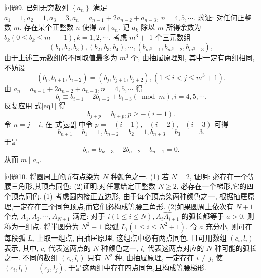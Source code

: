 问题9. 已知无穷数列 $\left\{a_n\right\}$ 满足 $a_1=1, a_2=1, a_3=3, a_n=a_{n-1}+2 a_{n-2}+a_{n-3}$, $n=4,5, \cdots$. 求证: 对任何正整数 $m$, 存在某个正整数 $n$ 使得 $m \mid a_n$.
记 $a_k$ 除以 $m$ 所得余数为 $b_k\left(0 \leqslant b_k \leqslant m^{-}-1\right), k=1,2, \cdots$. 考虑 $m^3+$ 1 个三元数组
$$
\left(b_1, b_2, b_3\right),\left(b_2, b_3, b_4\right), \cdots,\left(b_{m^3+1}, b_{m^3+2}, b_{m^3+3}\right),
$$
由于上述三元数组的不同取值最多为 $m^3$ 个, 由抽屉原理知, 其中一定有两组相同, 不妨设
$$
\left(b_i, b_{i+1}, b_{i+2}\right)=\left(b_j, b_{j+1}, b_{j+2}\right),\left(1 \leqslant i<j \leqslant m^3+1\right) .
$$
由 $a_n=a_{n-1}+2 a_{n-2}+a_{n-3}, n=4,5, \cdots$ 得
$$
b_i \equiv b_{i-1}+2 b_{i-2}+b_{i-3}(\bmod m), i=4,5, \cdots . \label{eq1}
$$
反复应用 式\ref{eq1} 得
$$
b_{j+p}=b_{i+p}, p \geqslant-(i-1) . \label{eq2}
$$
令 $n=j-i$, 在 式\ref{eq2} 中令 $p=-(i-1),-(i-2),-(i-3)$ 可得
$$
b_{n+1}=b_1=1, b_{n+2}=b_2=1, b_{n+3}=b_3==3 .
$$
于是
$$
b_n=b_{n+3}-2 b_{n+2}-b_{n+1}=0 .
$$
从而 $m \mid a_n$.



问题10. 将圆周上的所有点染为 $N$ 种颜色之一.
(1) 若 $N=2$, 证明: 必存在一个等腰三角形,其顶点同色;
(2)证明:对任意给定正整数 $N \geqslant 2$, 必存在一个梯形,它的四个顶点同色.
(1) 考虑圆内接正五边形, 由于每个顶点染两种颜色之一, 根据抽屉原理,一定存在三个同色顶点,而它们必构成等腰三角形.
(2)如果圆周上依次有 $N+1$ 个点 $A_1, A_2, \cdots, A_{N+1}$ 满足: 对于 $i(1 \leqslant i \leqslant N), \widehat{A_i A_{i+1}}$ 的弧长都等于 $a>0$, 则称为一组点.
将半圆分为 $N^2+1$ 段弧 $L_i\left(1 \leqslant i \leqslant N^2+1\right)$. 令 $a$ 充分小, 则可在每段弧 $L_i$ 上取一组点, 由抽屉原理, 这组点中必有两点同色, 且可用数组 $\left(c_i, l_i\right)$ 表示, 其中, $c_i$ 代表这两点的 $N$ 种颜色之一, $l_i$ 代表这两点对应的 $N$ 种可能的弧长之一.
不同的数组 $\left(c_i, l_i\right)$ 只有 $N^2$ 种, 由抽屉原理, 一定存在 $i \neq j$, 使 $\left(c_i, l_i\right)=\left(c_j, l_j\right)$, 于是这两组中存在四点同色,且构成等腰梯形.


